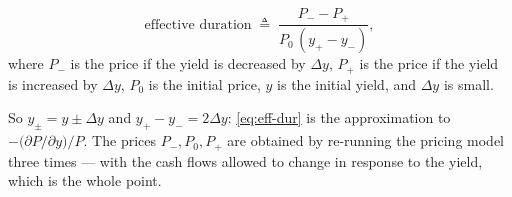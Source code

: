 \begin{definition}
	\begin{equation}
		\text{effective duration} \;\triangleq\; \frac{P_{-}-P_{+}}{P_{0}\,(y_{+}-y_{-})} , \label{eq:eff-dur}
	\end{equation}
	where $P_{-}$ is the price if the yield is decreased by $\Delta y$, $P_{+}$ is the price if the yield is increased by $\Delta y$, $P_{0}$ is the initial price, $y$ is the initial yield, and $\Delta y$ is small.
\end{definition}

\suppstart
So $y_{\pm}=y\pm\Delta y$ and $y_{+}-y_{-}=2\Delta y$: \eqref{eq:eff-dur} is the  approximation to $-\bigl(\partial P/\partial y\bigr)/P$.
The prices $P_{-},P_{0},P_{+}$ are obtained by re-running the pricing model three times --- with the cash flows allowed to change in response to the yield, which is the whole point.
\suppend


